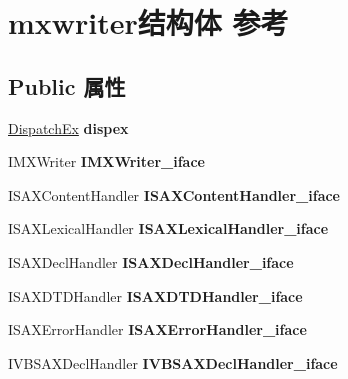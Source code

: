 \hypertarget{structmxwriter}{}\section{mxwriter结构体 参考}
\label{structmxwriter}
\subsection*{Public 属性}
\begin{DoxyCompactItemize}
\item 
\mbox{\label{structmxwriter_a0887c5d0fabe0aabc53e82e7a9b44f7c}} 
\hyperlink{struct_dispatch_ex}{Dispatch\+Ex} {\bfseries dispex}
\item 
\mbox{\label{structmxwriter_a22ccc9e4f075661810f3e06e7fdb757d}} 
I\+M\+X\+Writer {\bfseries I\+M\+X\+Writer\+\_\+iface}
\item 
\mbox{\label{structmxwriter_a9e6104350a4ed119127c56ef2110d08f}} 
I\+S\+A\+X\+Content\+Handler {\bfseries I\+S\+A\+X\+Content\+Handler\+\_\+iface}
\item 
\mbox{\label{structmxwriter_ab722df9b85bad275635d20c54668a5ed}} 
I\+S\+A\+X\+Lexical\+Handler {\bfseries I\+S\+A\+X\+Lexical\+Handler\+\_\+iface}
\item 
\mbox{\label{structmxwriter_add58671b0ac5ded25d5ac4d6ea3642ee}} 
I\+S\+A\+X\+Decl\+Handler {\bfseries I\+S\+A\+X\+Decl\+Handler\+\_\+iface}
\item 
\mbox{\label{structmxwriter_a7df8c9ba7e52f666ea626f862095b37b}} 
I\+S\+A\+X\+D\+T\+D\+Handler {\bfseries I\+S\+A\+X\+D\+T\+D\+Handler\+\_\+iface}
\item 
\mbox{\label{structmxwriter_aa3668c1f617c80c9eb719bee6ad0bf2b}} 
I\+S\+A\+X\+Error\+Handler {\bfseries I\+S\+A\+X\+Error\+Handler\+\_\+iface}
\item 
\mbox{\label{structmxwriter_ab40bdd941a5cd8783104a96b3a15c6ce}} 
I\+V\+B\+S\+A\+X\+Decl\+Handler {\bfseries I\+V\+B\+S\+A\+X\+Decl\+Handler\+\_\+iface}
\item 
\mbox{\label{structmxwriter_ac66e234e100ec64680427edceaaf73eb}} 

\end{DoxyCompactItemize}
